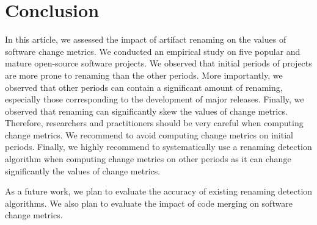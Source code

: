 \section{Conclusion}
\label{sec:conclusion}

In this article, we assessed the impact of artifact renaming on the values of software change metrics. We conducted an empirical study on five popular and mature open-source software projects. We observed that initial periods of projects are more prone to renaming than the other periods. More importantly, we observed that other periods can contain a significant amount of renaming, especially those corresponding to the development of major releases. Finally, we observed that renaming can significantly skew the values of change metrics. Therefore, researchers and practitioners should be very careful when computing change metrics. We recommend to avoid computing change metrics on initial periods. Finally, we highly recommend to systematically use a renaming detection algorithm when computing change metrics on other periods as it can change significantly the values of change metrics.

As a future work, we plan to evaluate the accuracy of existing renaming detection algorithms. We also plan to evaluate the impact of code merging on software change metrics.
